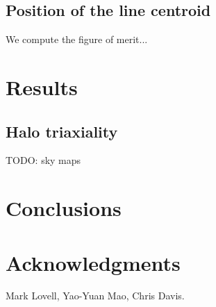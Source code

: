\documentclass[aps,prl,10pt,twocolumn,superscriptaddress,showpacs]{revtex4-1}
\begin{document}
\subsection{Position of the line centroid}

We compute the figure of merit... 


\section{Results}
\label{sec:results}






\subsection{Halo triaxiality}
\label{sec:triaxiality}

TODO: sky maps



\section{Conclusions}
\label{sec:conclusions}

 
\vspace{-0.5 cm}
	

\section*{Acknowledgments} 

Mark Lovell, Yao-Yuan Mao, Chris Davis.


\newcommand{\mnras}[0]{M.N.R.A.S.}

%	
	
\end{document}
